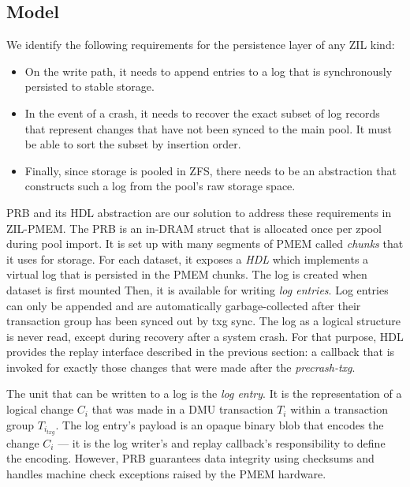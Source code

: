 \documentclass[12pt,a4paper,twoside]{book}
\begin{document}
\subsection{Model}\label{di:prb:structure}
We identify the following requirements for the persistence layer of any ZIL kind:
\begin{itemize}[noitemsep]
\item On the write path, it needs to append entries to a log that is synchronously persisted to stable storage.
\item In the event of a crash, it needs to recover the exact subset of log records that represent changes that have not been synced to the main pool.
    It must be able to sort the subset by insertion order.
\item Finally, since storage is pooled in ZFS, there needs to be an abstraction that constructs such a log from the pool's raw storage space.
\end{itemize}

PRB and its HDL abstraction are our solution to address these requirements in ZIL-PMEM.
The PRB is an in-DRAM struct that is allocated once per zpool during pool import.
It is set up with many segments of PMEM called \textit{chunks} that it uses for storage.
For each dataset, it exposes a \textit{HDL} which implements a virtual log that is persisted in the PMEM chunks.
The log is created when dataset is first mounted
Then, it is available for writing \textit{log entries}.
Log entries can only be appended and are automatically garbage-collected after their transaction group has been synced out by txg sync.
The log as a logical structure is never read, except during recovery after a system crash.
For that purpose, HDL provides the replay interface described in the previous section: a callback that is invoked for exactly those changes that were made after the \textit{precrash-txg}.

The unit that can be written to a log is the \textit{log entry}.
It is the representation of a logical change $C_i$ that was made in a DMU transaction $T_i$ within a transaction group $T_{i_{txg}}$.
The log entry's payload is an opaque binary blob that encodes the change $C_i$ --- it is the log writer's and replay callback's responsibility to define the encoding.
However, PRB guarantees data integrity using checksums and handles machine check exceptions raised by the PMEM hardware.
\end{document}
